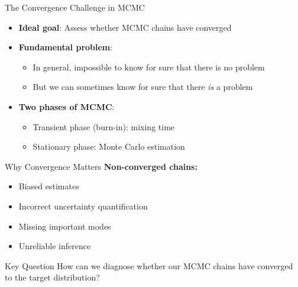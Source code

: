 \begin{frame}{The Convergence Challenge in MCMC}
	\begin{itemize}
		\item \textbf{Ideal goal}: Assess whether MCMC chains have converged
		\item \textbf{Fundamental problem}:
		      \begin{itemize}
			      \item In general, impossible to know for sure that there is no problem
			      \item But we can sometimes know for sure that there \textit{is} a problem
		      \end{itemize}
		\item \textbf{Two phases of MCMC}:
		      \begin{itemize}
			      \item Transient phase (burn-in): mixing time
			      \item Stationary phase: Monte Carlo estimation
		      \end{itemize}
	\end{itemize}

	\vspace{0.5cm}
	\begin{center}
	\end{center}
\end{frame}

\begin{frame}{Why Convergence Matters}
	\textbf{Non-converged chains:}
	\begin{itemize}
		\item Biased estimates
		\item Incorrect uncertainty quantification
		\item Missing important modes
		\item Unreliable inference
	\end{itemize}

	\vspace{0.5cm}
	\begin{block}{Key Question}
		How can we diagnose whether our MCMC chains have converged to the target distribution?
	\end{block}
\end{frame}


